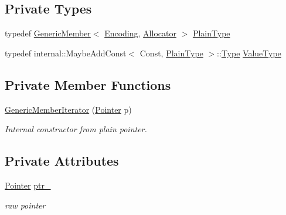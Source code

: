 \subsection*{Private Types}
\begin{DoxyCompactItemize}
\item 
typedef \mbox{\hyperlink{structrapidjson_1_1_generic_member}{Generic\+Member}}$<$ \mbox{\hyperlink{classrapidjson_1_1_encoding}{Encoding}}, \mbox{\hyperlink{classrapidjson_1_1_allocator}{Allocator}} $>$ \mbox{\hyperlink{classrapidjson_1_1_generic_member_iterator_abbee93e8c55379249e99c1d5c4255661}{Plain\+Type}}
\item 
typedef internal\+::\+Maybe\+Add\+Const$<$ Const, \mbox{\hyperlink{classrapidjson_1_1_generic_member_iterator_abbee93e8c55379249e99c1d5c4255661}{Plain\+Type}} $>$\+::\mbox{\hyperlink{namespacerapidjson_ae79a4751c1c460ff0de5ecc07874f3e4}{Type}} \mbox{\hyperlink{classrapidjson_1_1_generic_member_iterator_ad2b02bbaddb3cc35db1d6a70d7850481}{Value\+Type}}
\end{DoxyCompactItemize}
\subsection*{Private Member Functions}
\begin{DoxyCompactItemize}
\item 
\mbox{\hyperlink{classrapidjson_1_1_generic_member_iterator_a5defd2655cc9878bbc9431d0c2d1b2e0}{Generic\+Member\+Iterator}} (\mbox{\hyperlink{classrapidjson_1_1_generic_member_iterator_aa9d53504374c7c6bdf46775482c5b107}{Pointer}} p)
\begin{DoxyCompactList}\small\item\em Internal constructor from plain pointer. \end{DoxyCompactList}\end{DoxyCompactItemize}
\subsection*{Private Attributes}
\begin{DoxyCompactItemize}
\item 
\mbox{\hyperlink{classrapidjson_1_1_generic_member_iterator_aa9d53504374c7c6bdf46775482c5b107}{Pointer}} \mbox{\hyperlink{classrapidjson_1_1_generic_member_iterator_ad3ee810e5bbd347865eebcd50c993204}{ptr\+\_\+}}
\begin{DoxyCompactList}\small\item\em raw pointer \end{DoxyCompactList}\end{DoxyCompactItemize}
